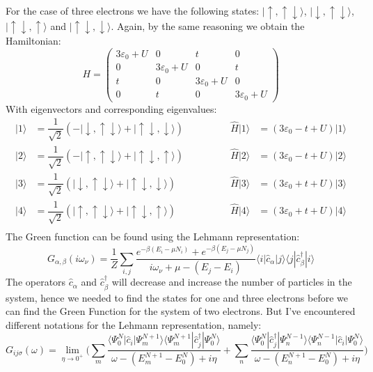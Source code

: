 \documentclass[12pt]{article}
\begin{document}
\newpage
\noindent
For the case of three electrons we have the following states: $|\!\uparrow,\uparrow\downarrow\rangle$, $|\!\downarrow,\uparrow\downarrow\rangle$, $|\!\uparrow\downarrow,\uparrow\rangle$ and $|\!\uparrow\downarrow,\downarrow\rangle$. Again, by the same reasoning we obtain the Hamiltonian:
\begin{equation}
H=\begin{pmatrix}
3\varepsilon_0+U&0&t&0\\
0&3\varepsilon_0+U&0&t\\
t&0&3\varepsilon_0+U&0\\
0&t&0&3\varepsilon_0+U
\end{pmatrix}
\end{equation}
With eigenvectors and corresponding eigenvalues:
\begin{align*}
|1\rangle&=\dfrac{1}{\sqrt{2}}(-|\downarrow,\uparrow\downarrow\rangle+|\uparrow\downarrow,\downarrow\rangle)\qquad\qquad&\hat{H}|1\rangle&=(3\varepsilon_0-t+U)|1\rangle\\
|2\rangle&=\dfrac{1}{\sqrt{2}}(-|\uparrow,\uparrow\downarrow\rangle+|\uparrow\downarrow,\uparrow\rangle)\qquad\qquad&\hat{H}|2\rangle&=(3\varepsilon_0-t+U)|2\rangle\\
|3\rangle&=\dfrac{1}{\sqrt{2}}(|\downarrow,\uparrow\downarrow\rangle+|\uparrow\downarrow,\downarrow\rangle)\qquad\qquad&\hat{H}|3\rangle&=(3\varepsilon_0+t+U)|3\rangle\\
|4\rangle&=\dfrac{1}{\sqrt{2}}(|\uparrow,\uparrow\downarrow\rangle+|\uparrow\downarrow,\uparrow\rangle)\qquad\qquad&\hat{H}|4\rangle&=(3\varepsilon_0+t+U)|4\rangle\\
\end{align*}
The Green function can be found using the Lehmann representation:
\begin{equation}
G_{\alpha,\beta}(i\omega_\nu)=\dfrac{1}{Z}\sum_{i,j}\dfrac{e^{-\beta(E_i-\mu N_i)}+e^{-\beta(E_j-\mu N_j)}}{i\omega_\nu+\mu-(E_j-E_i)}\langle i|\hat{c}_\alpha |j\rangle\langle j|\hat{c}_\beta^\dagger|i\rangle
\end{equation}
The operators $\hat{c}_\alpha$ and $\hat{c}_\beta^\dagger$ will decrease and increase the number of particles in the system, hence we needed to find the states for one and three electrons before we can find the Green Function for the system of two electrons. But I've encountered different notations for the Lehmann representation, namely:
\begin{equation}
G_{ij\sigma}(\omega)=\lim_{\eta\to 0^ +}\bigg (\sum_{m}\dfrac{\langle\Psi_0^N|\hat{c}_i|\Psi_m^ {N+1}\rangle\langle\Psi_m^ {N+1}|\hat{c}_j^\dagger|\Psi_0^ N\rangle}{\omega-(E_m^{N+1}-E_0^N)+i\eta}+\sum_{n}\dfrac{\langle\Psi_0^N|\hat{c}_j^\dagger|\Psi_n^ {N-1}\rangle\langle\Psi_n^ {N-1}|\hat{c}_i|\Psi_0^ N\rangle}{\omega-(E_n^{N+1}-E_0^N)+i\eta}\bigg )
\end{equation}
\end{document}
